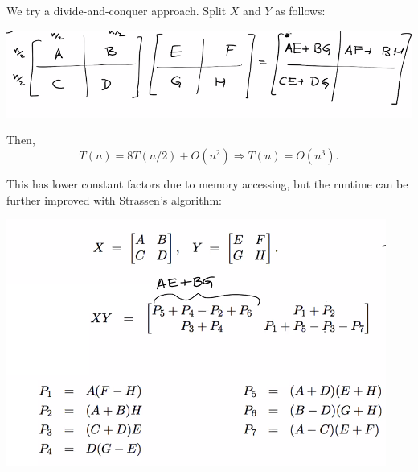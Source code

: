 \documentclass[11pt]{scrartcl}
\begin{document}
We try a divide-and-conquer approach.  Split $X$ and $Y$ as follows:
\begin{center}
\includegraphics[scale=.75]{split.png}
\end{center}
Then,
$$T(n) = 8T(n/2) + O(n^2) \Rightarrow T(n) = O(n^3).$$

This has lower constant factors due to memory accessing, but the runtime can be further improved with Strassen's algorithm:
\begin{center}
\includegraphics[scale=1]{strassen.png}
\end{center}
\end{document}
